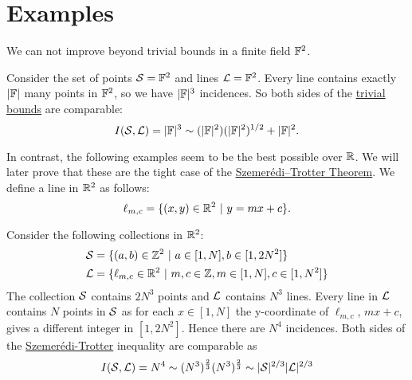 \section{Examples}
We can not improve beyond trivial bounds in a finite field $\mathbb F^2$. 
\begin{example}
Consider the set of points $\mathcal S=\mathbb F^2$ and lines 
$\mathcal L = \mathbb F^2$. Every line contains exactly $|\mathbb F|$ many points in $\mathbb F^2$, so we have $|\mathbb F|^3$ incidences. 
So both sides of the \hyperref[thm:trivial-ST-bounds]{trivial bounds} are comparable:
$$
I(\mathcal S,\mathcal L) = |\mathbb F|^3 \sim (|\mathbb F|^2)(|\mathbb F|^2)^{1/2} + |\mathbb F|^2.
$$
\end{example}
In contrast, the following examples seem to be the best possible over $\mathbb R$. We will later prove that these are the tight case of the \hyperref[thm:S-T]{Szemerédi–Trotter Theorem}.
We define a line in $\mathbb R^2$ as follows:
\[
    \ell_{m,c} = \{(x,y) \in \mathbb R^2 \ | \ y = mx+c\}.     
\]
\begin{example}
    Consider the following collections in $\mathbb R^2$:
    \begin{align*}
    \mathcal S &= \{ (a,b) \in \mathbb Z^2 \ | \ a\in [1,N], b \in [1,2N^2] \} \\
    \mathcal L &= \{ \ell_{m,c} \in \mathbb R^2 \ | \ m,c\in \mathbb Z, m\in [1,N], c \in [1,N^2] \} \end{align*}
    The collection $\mathcal S$ contains $2N^3$ points and $\mathcal L$ contains $N^3$ lines. Every line in $\mathcal L$ contains $N$ points in $\mathcal S$ as for each $x \in [1,N]$  the y-coordinate of $\ell_{m,c}$, $ mx+c$, gives a different integer in $[1,2N^2]$.
    Hence there are $N^4$ incidences. Both sides of the \hyperref[thm:S-T]{Szemerédi-Trotter} inequality are comparable as 
    $$ I(\mathcal S,\mathcal L) = N^4 \sim (N^3)^{\frac{2}{3}} (N^3)^{\frac{2}{3}} \sim |\mathcal S|^{2/3} |\mathcal L|^{2/3}$$
\end{example}

